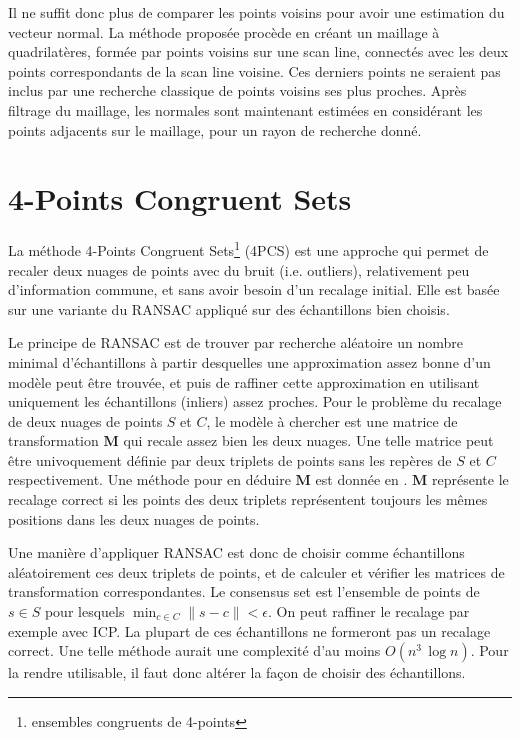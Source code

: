 \documentclass[a4paper,10pt]{scrreprt}
\begin{document}
Il ne suffit donc plus de comparer les points voisins pour avoir une estimation du vecteur normal. La méthode proposée procède en créant un maillage à quadrilatères, formée par points voisins sur une scan line, connectés avec les deux points correspondants de la scan line voisine. Ces derniers points ne seraient pas inclus par une recherche classique de points voisins ses plus proches. Après filtrage du maillage, les normales sont maintenant estimées en considérant les points adjacents sur le maillage, pour un rayon de recherche donné.


\section{4-Points Congruent Sets}
La méthode 4-Points Congruent Sets\footnote{ensembles congruents de 4-points} (4PCS) est une approche qui permet de recaler deux nuages de points avec du bruit (i.e. outliers), relativement peu d'information commune, et sans avoir besoin d'un recalage initial. Elle est basée sur une variante du RANSAC appliqué sur des échantillons bien choisis.

Le principe de RANSAC est de trouver par recherche aléatoire un nombre minimal d'échantillons à partir desquelles une approximation assez bonne d'un modèle peut être trouvée, et puis de raffiner cette approximation en utilisant uniquement les échantillons (inliers) assez proches. Pour le problème du recalage de deux nuages de points $S$ et $C$, le modèle à chercher est une matrice de transformation $\mathbf{M}$ qui recale assez bien les deux nuages. Une telle matrice peut être univoquement définie par deux triplets de points sans les repères de $S$ et $C$ respectivement. Une méthode pour en déduire $\mathbf{M}$ est donnée en \cite{Horn1986}. $\mathbf{M}$ représente le recalage correct si les points des deux triplets représentent toujours les mêmes positions dans les deux nuages de points.

Une manière d'appliquer RANSAC est donc de choisir comme échantillons aléatoirement ces deux triplets de points, et de calculer et vérifier les matrices de transformation correspondantes. Le consensus set est l'ensemble de points de $s \in S$ pour lesquels $\min_{c \in C} \| s - c \| < \epsilon$. On peut raffiner le recalage par exemple avec ICP. La plupart de ces échantillons ne formeront pas un recalage correct. Une telle méthode aurait une complexité d'au moins $O(n^3 \, \log n)$. Pour la rendre utilisable, il faut donc altérer la façon de choisir des échantillons.
\end{document}
